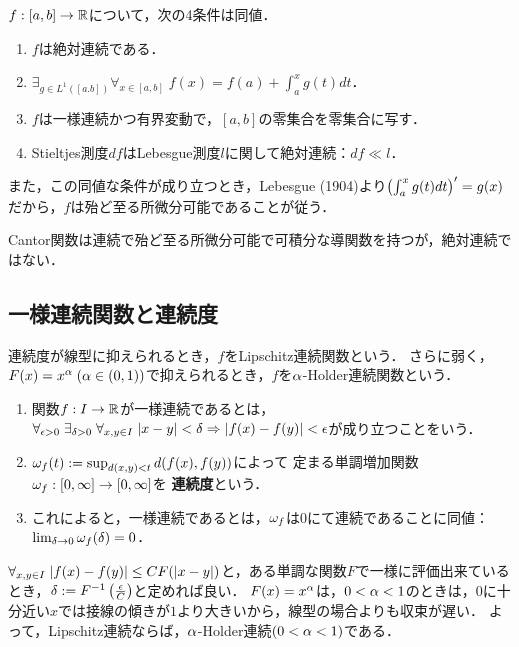 \documentclass[uplatex,dvipdfmx]{jsreport}
\begin{document}
\begin{theorem}
    $f:[a,b]\to\mathbb{R}$について，次の4条件は同値．
    \begin{enumerate}
        \item $f$は絶対連続である．
        \item $\exists_{g\in L^1([a.b])}\forall_{x\in[a,b]}\;f(x)=f(a)+\int_a^xg(t)dt$．
        \item $f$は一様連続かつ有界変動で，$[a,b]$の零集合を零集合に写す．
        \item Stieltjes測度$df$はLebesgue測度$l$に関して絶対連続：$df\ll l$．
    \end{enumerate}
    また，この同値な条件が成り立つとき，Lebesgue (1904)より$\left(\int^x_ag(t)dt\right)'=g(x)$だから，$f$は殆ど至る所微分可能であることが従う．
\end{theorem}

\begin{example}
    Cantor関数は連続で殆ど至る所微分可能で可積分な導関数を持つが，絶対連続ではない．
\end{example}

\subsection{一様連続関数と連続度}

\begin{tcolorbox}[colframe=ForestGreen, colback=ForestGreen!10!white,breakable,colbacktitle=ForestGreen!40!white,coltitle=black,fonttitle=\bfseries\sffamily,
title=]
    連続度が線型に抑えられるとき，$f$をLipschitz連続関数という．
    さらに弱く，$F(x)=x^\alpha\;(\alpha\in(0,1))$で抑えられるとき，$f$を$\alpha$-Holder連続関数という．
\end{tcolorbox}

\begin{definition}\mbox{}
    \begin{enumerate}
        \item 関数$f:I\to\mathbb{R}$が一様連続であるとは，$\forall_{\epsilon>0}\;\exists_{\delta>0}\;\forall_{x,y\in I}\;\lvert x-y\rvert<\delta\Rightarrow\lvert f(x)-f(y)\rvert<\epsilon$が成り立つことをいう．
        \item $\omega_f(t):=\sup_{d(x,y)<t}d(f(x),f(y))$によって
        定まる単調増加関数$\omega_f:[0,\infty]\to[0,\infty]$を
        \textbf{連続度}という．
        \item これによると，一様連続であるとは，$\omega_f$は$0$にて連続であることに同値：$\lim_{\delta\to0}\omega_f(\delta)=0$．
    \end{enumerate}
\end{definition}
\begin{remarks}
    $\forall_{x,y\in I}\;\lvert f(x)-f(y)\rvert\le CF(\lvert x-y\rvert)$と，ある単調な関数$F$で一様に評価出来ているとき，$\delta:=F^{-1}\left(\frac{\epsilon}{C}\right)$と定めれば良い．
    $F(x)=x^\alpha$は，$0<\alpha<1$のときは，$0$に十分近い$x$では接線の傾きが$1$より大きいから，線型の場合よりも収束が遅い．
    よって，Lipschitz連続ならば，$\alpha$-Holder連続$(0<\alpha<1)$である．
\end{remarks}
\end{document}
